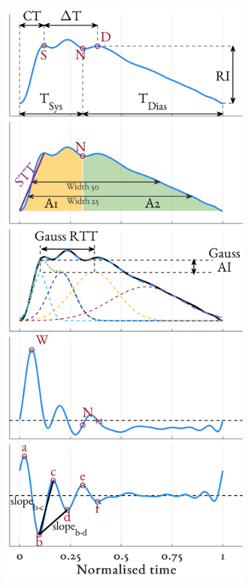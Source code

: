 \documentclass[fleqn,10pt]{wlscirep}
\begin{document}
\begin{figure}[ht]
\begin{subfigure}{.24\textwidth}
		\caption{}
	\end{subfigure}
	\begin{subfigure}{.24\textwidth}
		\centering
		\includegraphics[height = \figHeight]{PPG_feats_max_infusion.png}

\end{subfigure}
\end{figure}
\end{document}

